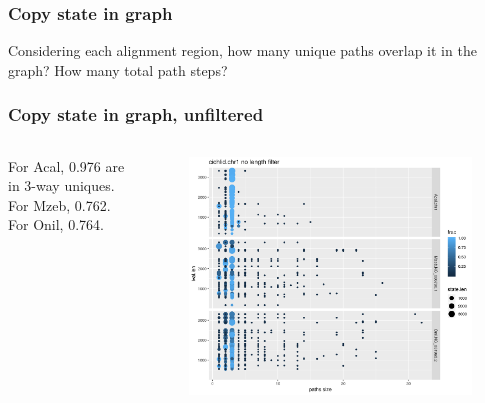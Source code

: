 \documentclass[aspectratio=169]{beamer}
\begin{document}
\begin{frame}
  \frametitle{Copy state in graph}
  Considering each alignment region, how many unique paths overlap it in the graph? How many total path steps?
\end{frame}

\begin{frame}
  \frametitle{Copy state in graph, unfiltered}
  \begin{columns}[c] %
    For Acal, 0.976 are in 3-way uniques.
    For Mzeb, 0.762.
    For Onil, 0.764.
    \begin{figure}
      \includegraphics[scale=0.42,center]{cichlid_chr1_busco_multicov_len_vs_path_size.png}
    \end{figure}
  \end{columns}
\end{frame}
\end{document}
